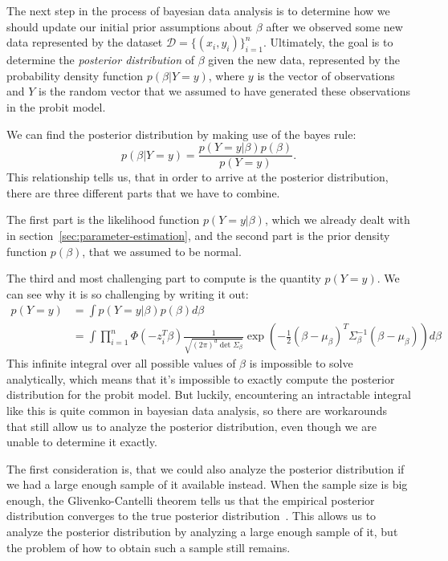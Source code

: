 The next step in the process of bayesian data analysis
is to determine how we should update our initial prior
assumptions about $\beta$ after we observed some new data
represented by the dataset $\mathcal{D} = \{(x_i, y_i)\}_{i=1}^n$.
Ultimately, the goal is to determine the
\textit{posterior distribution} of $\beta$ given the new data,
represented by the probability density function
$p(\beta | Y=y)$, where $y$ is the
vector of observations and $Y$ is the random vector that we
assumed to have generated these observations in the probit model.

We can find the posterior distribution by making use of the bayes rule:
\begin{equation}
    p(\beta | Y=y) = \frac{p(Y=y | \beta) p(\beta)}{p(Y=y)}.
\end{equation}
This relationship tells us, that in order to arrive at the
posterior distribution, there
are three different parts that we have to combine.

The first part is the likelihood function $p(Y=y|\beta)$,
which we already dealt with in section~\ref{sec:parameter-estimation}, and
the second part is the prior density function $p(\beta)$,
that we assumed to be normal.

The third and most challenging part to compute is the quantity $p(Y=y)$.
We can see why it is so challenging by writing it out:
\begin{equation}
    \begin{split}
        p(Y=y) &= \int p(Y=y|\beta)p(\beta) d\beta \\
        &= \int \prod_{i=1}^n \Phi(- z_i^T \beta)
        \frac{1}{\sqrt{(2\pi)^d \det{\Sigma_\beta}}}
        \exp{\left(-\frac{1}{2}(\beta - \mu_\beta)^T \Sigma_\beta^{-1}(\beta - \mu_\beta)\right)} d\beta
    \end{split}
\end{equation}
This infinite integral over all possible values of $\beta$
is impossible to solve analytically, which means that
it's impossible to exactly compute the posterior distribution
for the probit model.
But luckily, encountering an intractable integral like this
is quite common in bayesian data analysis, so
there are workarounds that still allow us to analyze the
posterior distribution, even though we are unable
to determine it exactly.

The first consideration is, that we could also analyze the posterior
distribution if we had a large enough sample of it available instead.
When the sample size is big enough, the Glivenko-Cantelli theorem
tells us that the empirical posterior distribution converges
to the true posterior distribution~\cite{glivenko-cantelli}.
This allows us to analyze the posterior
distribution by analyzing a large enough sample of it,
but the problem of how to obtain such a sample still remains.

